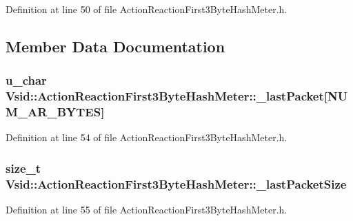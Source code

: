 Definition at line 50 of file Action\-Reaction\-First3\-Byte\-Hash\-Meter.\-h.



\subsection{Member Data Documentation}
\hypertarget{class_vsid_1_1_action_reaction_first3_byte_hash_meter_af21e55c2278704e0741e51829cfbee46}{
\subsubsection[{\-\_\-last\-Packet}]{\setlength{\rightskip}{0pt plus 5cm}u\-\_\-char Vsid\-::\-Action\-Reaction\-First3\-Byte\-Hash\-Meter\-::\-\_\-last\-Packet\mbox{[}{\bf N\-U\-M\-\_\-\-A\-R\-\_\-\-B\-Y\-T\-E\-S}\mbox{]}\hspace{0.3cm}{\ttfamily [protected]}}}\label{class_vsid_1_1_action_reaction_first3_byte_hash_meter_af21e55c2278704e0741e51829cfbee46}


Definition at line 54 of file Action\-Reaction\-First3\-Byte\-Hash\-Meter.\-h.

\hypertarget{class_vsid_1_1_action_reaction_first3_byte_hash_meter_ab48d56df173aa8838dafaa9cd24cd8a5}{
\subsubsection[{\-\_\-last\-Packet\-Size}]{\setlength{\rightskip}{0pt plus 5cm}size\-\_\-t Vsid\-::\-Action\-Reaction\-First3\-Byte\-Hash\-Meter\-::\-\_\-last\-Packet\-Size\hspace{0.3cm}{\ttfamily [protected]}}}\label{class_vsid_1_1_action_reaction_first3_byte_hash_meter_ab48d56df173aa8838dafaa9cd24cd8a5}


Definition at line 55 of file Action\-Reaction\-First3\-Byte\-Hash\-Meter.\-h.


